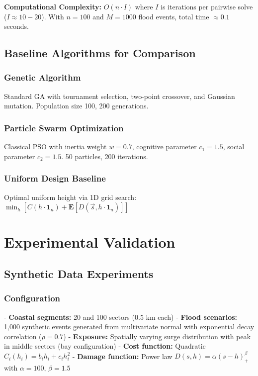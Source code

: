 \documentclass[3p,twocolumn]{elsarticle}
\begin{document}
\textbf{Computational Complexity:} $O(n \cdot I)$ where $I$ is iterations per pairwise solve ($I \approx 10-20$). With $n=100$ and $M=1000$ flood events, total time $\approx 0.1$ seconds.

\subsection{Baseline Algorithms for Comparison}

\subsubsection{Genetic Algorithm}
Standard GA with tournament selection, two-point crossover, and Gaussian mutation. Population size 100, 200 generations.

\subsubsection{Particle Swarm Optimization}
Classical PSO with inertia weight $w=0.7$, cognitive parameter $c_1=1.5$, social parameter $c_2=1.5$. 50 particles, 200 iterations.

\subsubsection{Uniform Design Baseline}
Optimal uniform height via 1D grid search: $\min_h [C(h \cdot \mathbf{1}_n) + \mathbf{E}[D(\vec{s}, h \cdot \mathbf{1}_n)]]$

\section{Experimental Validation}

\subsection{Synthetic Data Experiments}

\subsubsection{Configuration}
- \textbf{Coastal segments:} 20 and 100 sectors (0.5 km each)
- \textbf{Flood scenarios:} 1,000 synthetic events generated from multivariate normal with exponential decay correlation ($\rho=0.7$)
- \textbf{Exposure:} Spatially varying surge distribution with peak in middle sectors (bay configuration)
- \textbf{Cost function:} Quadratic $C_i(h_i) = b_i h_i + c_i h_i^2$
- \textbf{Damage function:} Power law $D(s,h) = \alpha(s-h)_+^{\beta}$ with $\alpha=100$, $\beta=1.5$
\end{document}
